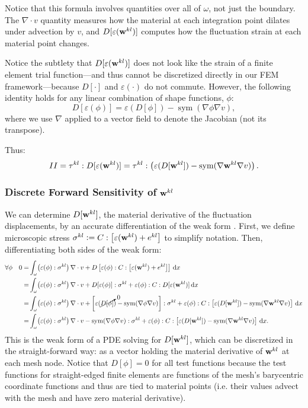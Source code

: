 \documentclass[10pt]{article}
\renewcommand{\div}{\nabla \cdot}
\providecommand{\shape}{\omega}
\providecommand{\vint}[3][x]{\int_{#2} \! #3 \, \mathrm{d}#1}
\renewcommand{\vec}[1]{{\bf #1}}
\newcommand\pr[1]{\prettyref{#1}}
\def\w{\vec{w}}
\def\strain{\varepsilon}
\DeclareMathOperator*{\sym}{sym}
\newcommand{\defeq}{\vcentcolon=}
\begin{document}
Notice that this formula involves quantities over all of $\omega$, not just the boundary.
The $\div v$ quantity measures how the material at each integration point
dilates under advection by $v$, and $D[\strain(\w^{kl})]$ computes how the
fluctuation strain at each material point changes.

Notice the subtlety that $D[\strain(\w^{kl})]$ does not look like the strain of
a finite element trial function---and thus cannot be discretized directly in
our FEM framework---because $D[\cdot]$ and $\strain(\cdot)$ do not commute.
However, the following identity holds for any linear combination of shape
functions, $\phi$:
$$
D[\strain(\phi)] = \strain(D[\phi]) - \sym(\nabla \phi \nabla v),
$$
where we use $\nabla$ applied to a vector field to denote the Jacobian (not its
transpose).

Thus:
$$
II = \tau^{kl} : D[\strain(\w^{kl})]
   = \tau^{kl} : \left(\strain(D[\w^{kl}]) - \sym(\nabla \w^{kl} \nabla v) \right).
$$
\subsubsection{Discrete Forward Sensitivity of \texorpdfstring{$\w^{kl}$}{w\textasciicircum kl}}
We can determine $D[\w^{kl}]$, the material derivative of the fluctuation
displacements, by an accurate differentiation of the weak form
\pr{eqn:weak_cell}. First, we define microscopic stress $\sigma^{kl} \defeq C :
\left[\strain(\w^{kl}) + e^{kl}\right]$ to simplify notation. Then,
differentiating both sides of the weak form:
\begin{align}
    \notag
\forall \phi \quad 0
   = &
    \vint{\shape}{\left(\strain(\phi) : \sigma^{kl} \right) \div v +
             D\left[\strain(\phi) : C : \left[\strain(\w^{kl}) + e^{kl}\right] \right]}
\notag
\\ = &
    \vint{\shape}{\left(\strain(\phi) : \sigma^{kl} \right) \div v +
             D[\strain(\phi)] : \sigma^{kl}  +
             \strain(\phi) : C : D[\strain(\w^{kl})]}
\notag
\\ = &
    \vint{\shape}{\left(\strain(\phi) : \sigma^{kl} \right) \div v
    + \left[\strain(\cancelto{0}{D[\phi]}) - \sym(\nabla \phi \nabla v)\right] : \sigma^{kl} 
    + \strain(\phi) : C : \left[\strain(D[\w^{kl}]) - \sym(\nabla \w^{kl} \nabla v)\right]}
\notag
\\ = &
    \vint{\shape}{\left(\strain(\phi) : \sigma^{kl} \right) \div v
    -  \sym(\nabla \phi \nabla v) : \sigma^{kl} 
    + \strain(\phi) : C : \left[\strain(D[\w^{kl}]) - \sym(\nabla \w^{kl} \nabla v)\right]}
.
\label{eqn:discretizable_weak_diff}
\end{align}
This is the weak form of a PDE solving for $D[\w^{kl}]$, which can be
discretized in the straight-forward way: as a vector holding the material
derivative of $\w^{kl}$ at each mesh node. Notice that $D[\phi] = 0$ for all
test functions because the test functions for straight-edged finite elements
are functions of the mesh's barycentric coordinate functions and thus are tied
to material points (i.e. their values advect with the mesh and have zero
material derivative).
\end{document}
